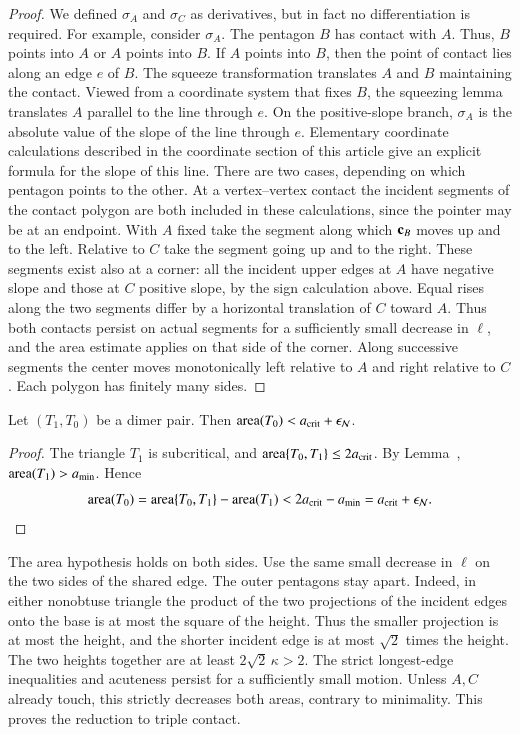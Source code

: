 \begin{proof}
We defined $\sigma_A$ and $\sigma_C$ as derivatives, but in fact no
differentiation is required.  For example, consider $\sigma_A$.  The
pentagon $B$ has contact with $A$.  Thus, $B$ points into $A$ or $A$
points into $B$.  If $A$ points into $B$, then the point of contact
lies along an edge $e$ of $B$.  The squeeze transformation translates
$A$ and $B$ maintaining the contact.  Viewed from a coordinate system
that fixes $B$, the squeezing lemma translates $A$ parallel to the
line through $e$.  On the positive-slope branch, $\sigma_A$ is the absolute value of
the slope of the line through $e$.  Elementary coordinate calculations
described in the coordinate section of this article give an explicit
formula for the slope of this line.  There are two cases, depending on
which pentagon points to the other. At a vertex--vertex contact the
incident segments of the contact polygon are both included in these
calculations, since the pointer may be at an endpoint. With $A$
fixed take the segment along which ${\mathbf c}_B$ moves up and to the left.
Relative to $C$ take the segment going up and to the right. These
segments exist also at a corner: all the incident upper edges at $A$
have negative slope and those at $C$ positive slope, by the sign
calculation above. Equal rises along the two segments differ by a
horizontal translation of $C$ toward $A$. Thus both contacts persist
on actual segments for a sufficiently small decrease in $\ell$, and
the area estimate applies on that side of the corner. Along successive
segments the center moves monotonically left relative to $A$ and right
relative to $C$. Each polygon has finitely many sides.
\end{proof}

\begin{lemma}
  Let $(T_1,T_0)$ be a dimer pair.
  Then ${\operatorname{area}}(T_0) < a_\text{crit}+\epsilon_{\mathcal N}$.
\end{lemma}

\begin{proof}
The triangle $T_1$ is subcritical, and
${\operatorname{area}}\{T_0,T_1\}\le2a_\text{crit}$.  By Lemma~,
${\operatorname{area}}(T_1)>a_\text{min}$.  Hence
\begin{equation}\libel{eq:dimer-acrit-epsN}
\area(T_0) = \area\{T_0,T_1\} - \area(T_1) 
< 2\acrit - \ao = \acrit+\epsN.
\end{equation}
\end{proof}

The area hypothesis holds on both sides. Use the same small decrease in
$\ell$ on the two sides of the shared edge. The outer pentagons stay
apart. Indeed, in either nonobtuse triangle the product of the two
projections of the incident edges onto the base is at most the square
of the height. Thus the smaller projection is at most the height,
and the shorter incident edge is at most $\sqrt2$ times the height.
The two heights together are at least $2\sqrt2\,\kappa>2$.
The strict longest-edge inequalities and acuteness persist for a
sufficiently small motion. Unless $A,C$ already touch, this strictly
decreases both areas, contrary to minimality. This proves the reduction
to triple contact.

